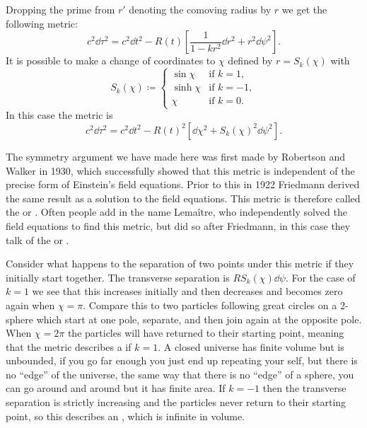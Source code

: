 \documentclass[fleqn]{NotesClass}
\begin{document}
    Dropping the prime from \(r'\) denoting the comoving radius by \(r\) we get the following metric:
    \begin{equation}
        c^2\dd{\tau}^2 = c^2\dd{t}^2 - R(t)\left[ \frac{1}{1 - kr^2}\dd{r}^2 + r^2\dd{\psi}^2 \right].
    \end{equation}
    It is possible to make a change of coordinates to \(\chi\) defined by \(r = S_k(\chi)\) with
    \begin{equation}
        S_k(\chi) \coloneqq 
        \begin{cases}
            \sin \chi & \text{if } k = 1,\\
            \sinh \chi & \text{if } k = -1,\\
            \chi & \text{if } k = 0.
        \end{cases}
    \end{equation}
    In this case the metric is
    \begin{equation}
        c^2\dd{\tau}^2 = c^2\dd{t}^2 - R(t)^2[\dd{\chi}^2 + S_k(\chi)^2 \dd{\psi}^2].
    \end{equation}
    
    The symmetry argument we have made here was first made by Robertson and Walker in 1930, which successfully showed that this metric is independent of the precise form of Einstein's field equations.
    Prior to this in 1922 Friedmann derived the same result as a solution to the field equations.
    This metric is therefore called the  or .
    Often people add in the name Lema\^itre, who independently solved the field equations to find this metric, but did so after Friedmann, in this case they talk of the  or .
    
    Consider what happens to the separation of two points under this metric if they initially start together.
    The transverse separation is \(R S_k(\chi)\dd{\psi}\).
    For the case of \(k = 1\) we see that this increases initially and then decreases and becomes zero again when \(\chi = \pi\).
    Compare this to two particles following great circles on a 2-sphere which start at one pole, separate, and then join again at the opposite pole.
    When \(\chi = 2\pi\) the particles will have returned to their starting point, meaning that the metric describes a  if \(k = 1\).
    A closed universe has finite volume but is unbounded, if you go far enough you just end up repeating your self, but there is no \enquote{edge} of the universe, the same way that there is no \enquote{edge} of a sphere, you can go around and around but it has finite area.
    If \(k = -1\) then the transverse separation is strictly increasing and the particles never return to their starting point, so this describes an , which is infinite in volume.
    
\end{document}
